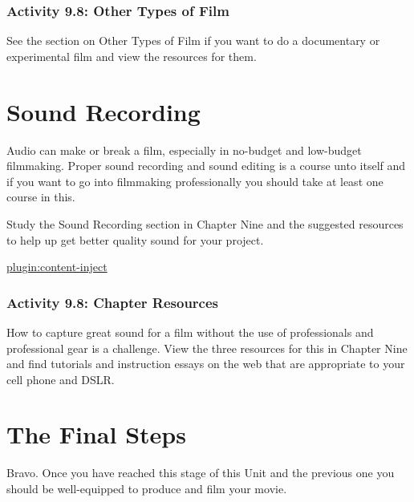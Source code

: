 \documentclass[
]{book}
\begin{document}
\hypertarget{activity-9.8-other-types-of-film}{%
\subsubsection*{Activity 9.8: Other Types of Film}\label{activity-9.8-other-types-of-film}}

See the section on Other Types of Film if you want to do a documentary or experimental film and view the resources for them.

\hypertarget{sound-recording}{%
\section*{Sound Recording}\label{sound-recording}}

Audio can make or break a film, especially in no-budget and low-budget filmmaking. Proper sound recording and sound editing is a course unto itself and if you want to go into filmmaking professionally you should take at least one course in this.

Study the Sound Recording section in Chapter Nine and the suggested resources to help up get better quality sound for your project.

\href{../_9-9}{plugin:content-inject}

\hypertarget{activity-9.8-chapter-resources}{%
\subsubsection*{Activity 9.8: Chapter Resources}\label{activity-9.8-chapter-resources}}

How to capture great sound for a film without the use of professionals and professional gear is a challenge. View the three resources for this in Chapter Nine and find tutorials and instruction essays on the web that are appropriate to your cell phone and DSLR.

\hypertarget{the-final-steps}{%
\section*{The Final Steps}\label{the-final-steps}}

Bravo. Once you have reached this stage of this Unit and the previous one you should be well-equipped to produce and film your movie.
\end{document}
